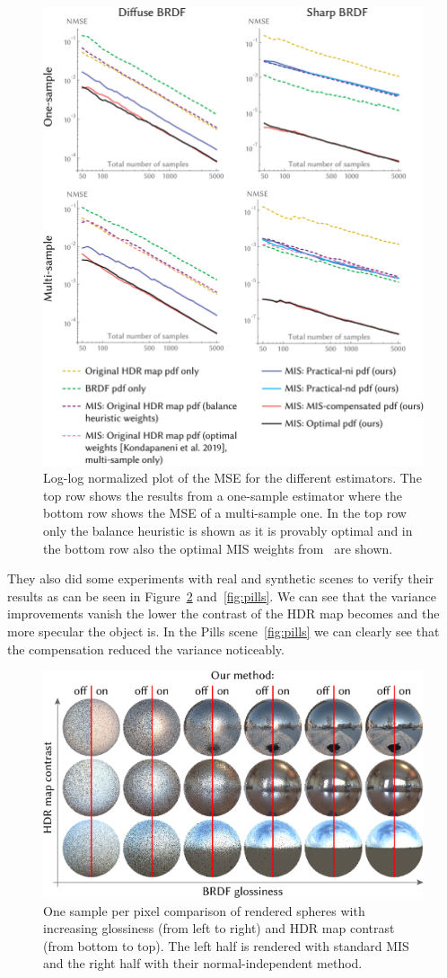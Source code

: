 \begin{figure}
    \centering
    \includegraphics[width=.7\textwidth]{images/error_plots.png}
    \caption{Log-log normalized plot of the MSE for the different estimators.
    The top row shows the results from a one-sample estimator where the bottom row shows the MSE of a multi-sample one.
    In the top row only the balance heuristic is shown as it is provably optimal
    and in the bottom row also the optimal MIS weights from~\cite{Kondapaneni2019} are shown.
    \cite[Figure~6]{Karlik2019}}
    \label{fig:error_plots}
\end{figure}

They also did some experiments with real and synthetic scenes to verify their results as can be seen in Figure~\ref{fig:sphere_comparison} and~\ref{fig:pills}.
We can see that the variance improvements vanish the lower the contrast of the HDR map becomes and the more specular the object is.
In the Pills scene~\ref{fig:pills} we can clearly see that the compensation reduced the variance noticeably.

\begin{figure}
    \centering
    \includegraphics[width=.6\textwidth]{images/sphere_comparison.png}
    \caption{One sample per pixel comparison of rendered spheres with increasing glossiness (from left to right) and HDR map contrast (from bottom to top).
    The left half is rendered with standard MIS and the right half with their normal-independent method.
    \cite[Figure~7]{Karlik2019}}
    \label{fig:sphere_comparison}
\end{figure}


